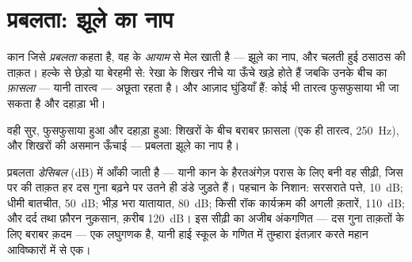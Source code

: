 \section{प्रबलता: झूले का नाप}

\begin{proposition}[प्रबलता ही आयाम है]\label{prop:g8:sound-pitch-loudness:loudness}
कान जिसे \emph{प्रबलता} कहता है, वह  के \emph{आयाम}
से मेल खाती है --- झूले का नाप, और चलती हुई ठसाठस की ताक़त।
हल्के से छेड़ो या बेरहमी से: रेखा के शिखर नीचे या ऊँचे खड़े होते हैं
जबकि उनके बीच का \emph{फ़ासला} --- यानी तारत्व --- अछूता रहता है।
 और  आज़ाद घुंडियाँ हैं: कोई भी तारत्व फुसफुसाया भी जा
सकता है और दहाड़ा भी।
\end{proposition}

\begin{omfigure}

{\small वही सुर, फुसफुसाया हुआ और दहाड़ा हुआ: शिखरों के बीच बराबर
फ़ासला (एक ही तारत्व, \qty{250}{Hz}), और शिखरों की असमान ऊँचाई ---
प्रबलता झूले का नाप है।}
\end{omfigure}

\begin{example}[डेसिबल की सीढ़ी]\label{ex:g8:sound-pitch-loudness:decibels}
प्रबलता \emph{डेसिबल} (\unit{dB}) में आँकी जाती है ---
यानी कान के हैरतअंगेज़ परास के लिए बनी वह सीढ़ी, जिस पर  की ताक़त
हर दस गुना बढ़ने पर उतने ही डंडे जुड़ते हैं। पहचान के निशान: सरसराते
पत्ते, \qty{10}{dB}; धीमी बातचीत, \qty{50}{dB}; भीड़ भरा यातायात,
\qty{80}{dB}; किसी रॉक कार्यक्रम की अगली क़तारें, \qty{110}{dB}; और
दर्द तथा फ़ौरन नुक़सान, क़रीब \qty{120}{dB}। इस सीढ़ी का अजीब अंकगणित
--- दस गुना ताक़तों के लिए बराबर क़दम --- एक लघुगणक है, यानी हाई स्कूल
के गणित में तुम्हारा इंतज़ार करते महान आविष्कारों में से एक।
\end{example}

